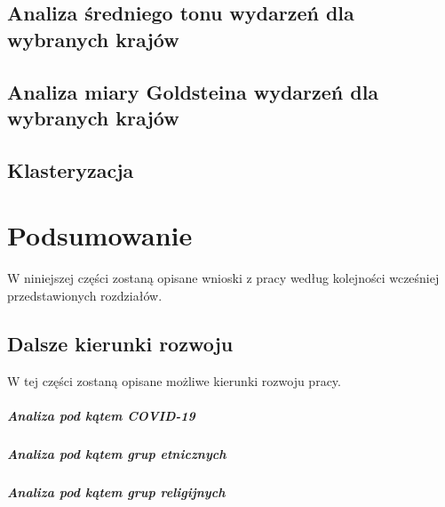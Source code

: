 \documentclass[11pt]{report}
\begin{document}
    \section{Analiza średniego tonu wydarzeń dla wybranych krajów}


    \section{Analiza miary Goldsteina wydarzeń dla wybranych krajów}


    \section{Klasteryzacja}


    \chapter{Podsumowanie}
    W niniejszej części zostaną opisane wnioski z pracy według kolejności wcześniej przedstawionych rozdziałów.


    \section{Dalsze kierunki rozwoju}
    W tej części zostaną opisane możliwe kierunki rozwoju pracy.

    \paragraph{Analiza pod kątem COVID-19}

    \paragraph{Analiza pod kątem grup etnicznych}

    \paragraph{Analiza pod kątem grup religijnych}



    \newpage
    \printbibliography[title={Bibliografia}]
\end{document}
